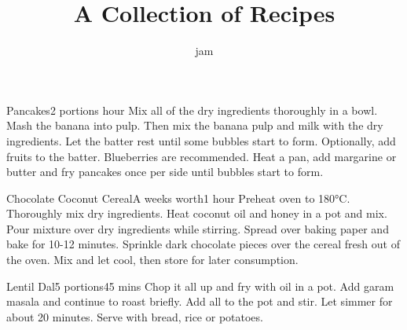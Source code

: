 \documentclass[]{article}
\title{A Collection of Recipes}
\author{jam}
\begin{document}
\renewcommand*{\recipetitlefont}{\large\bfseries\sffamily}
\renewcommand*{\recipenumberfont}{\large\bfseries\sffamily}
\renewcommand*{\recipequantityfont}{\sffamily\bfseries}
\renewcommand*{\recipeunitfont}{\sffamily}
\renewcommand*{\recipeingredientfont}{\sffamily}
\renewcommand*{\recipefreeformfont}{\itshape}
\maketitle

\tableofcontents
\begin{center}
\begin{recipe}{Pancakes}{2 portions}{ hour}
	Mix all of the dry ingredients thoroughly in a bowl.
	Mash the banana into pulp.
	Then mix the banana pulp and milk with the dry ingredients.
	Let the batter rest until some bubbles start to form.
	Optionally, add fruits to the batter.
	Blueberries are recommended.
	\freeform Heat a pan, add margarine or butter and fry pancakes once per side until bubbles start to form.
	\freeform\hrulefill
\end{recipe}

\begin{recipe}{Chocolate Coconut Cereal}{A weeks worth}{1 hour}
	Preheat oven to 180°C.
	Thoroughly mix dry ingredients.
	Heat coconut oil and honey in a pot and mix.
	Pour mixture over dry ingredients while stirring.
	\newstep
	Spread over baking paper and bake for 10-12 minutes.
	Sprinkle dark chocolate pieces over the cereal fresh out of the oven.
	Mix and let cool, then store for later consumption.
	\freeform\hrulefill
\end{recipe}

\begin{recipe}{Lentil Dal}{5 portions}{45 mins}
	Chop it all up and fry with oil in a pot.
	Add garam masala and continue to roast briefly.
	Add all to the pot and stir.
	Let simmer for about 20 minutes.
	\freeform Serve with bread, rice or potatoes.
	\freeform\hrulefill
\end{recipe}


\end{center}
\end{document}
